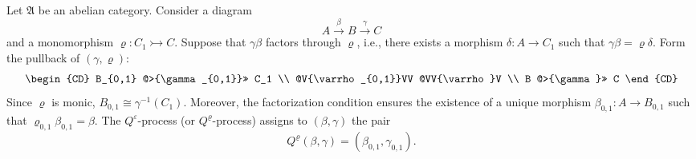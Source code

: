 \begin{definition}
Let $\mathfrak{A}$ be an abelian category. Consider a diagram
\[
A \xrightarrow{\beta} B \xrightarrow{\gamma} C
\]
and a monomorphism $\varrho : C_1 \rightarrowtail C$. Suppose that $\gamma\beta$ factors through $\varrho$, i.e., there exists a morphism $\delta : A \to C_1$ such that $\gamma\beta = \varrho\delta$. Form the pullback of $(\gamma, \varrho)$:
\[
\begin{CD}
B_{0,1} @>{\gamma_{0,1}}>> C_1 \\
@V{\varrho_{0,1}}VV @VV{\varrho}V \\
B @>{\gamma}>> C
\end{CD}
\]
Since $\varrho$ is monic, $B_{0,1} \cong \gamma^{-1}(C_1)$. Moreover, the factorization condition ensures the existence of a unique morphism $\beta_{0,1} : A \to B_{0,1}$ such that $\varrho_{0,1}\beta_{0,1} = \beta$. The $Q^{\varepsilon}$-process (or $Q^{\varrho}$-process) assigns to $(\beta, \gamma)$ the pair
\[
Q^{\varrho}(\beta, \gamma) = (\beta_{0,1}, \gamma_{0,1}).
\]
\end{definition}

